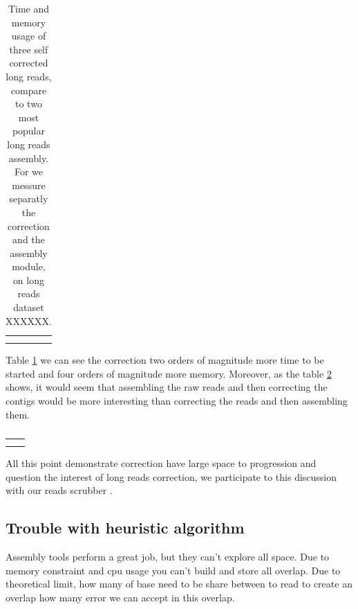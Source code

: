 \documentclass[./main.tex]{subfiles}
\begin{document}
\begin{table}[ht]
    \centering
    \begin{tabular}{c|c}
         &  \\
         & 
    \end{tabular}
    \caption{Time and memory usage of three self corrected long reads, compare to two most popular long reads assembly. For \canu we messure separatly the correction and the assembly module, on long reads dataset XXXXXX.}
    \label{intro:tab:correctionvsassemblytime}
\end{table}

Table \ref{intro:tab:correctionvsassemblytime} we can see the correction two orders of magnitude more time to be started and four orders of magnitude more memory. Moreover, as the table \ref{intro:tab:assembleandcorrect} shows, it would seem that assembling the raw reads and then correcting the contigs would be more interesting than correcting the reads and then assembling them.

\begin{table}[]
    \centering
    \begin{tabular}{c|c}
         &  \\
         & 
    \end{tabular}
    \caption{}
    \label{intro:tab:assembleandcorrect}
\end{table}

All this point demonstrate correction have large space to progression and question the interest of long reads correction, we participate to this discussion with our reads scrubber \yacrd.


\subsection{Trouble with heuristic algorithm}


Assembly tools perform a great job, but they can't explore all space.
Due to memory constraint and cpu usage you can't build and store all overlap.
Due to theoretical limit, how many of base need to be share between to read to create an overlap how many error we can accept in this overlap.
\end{document}
